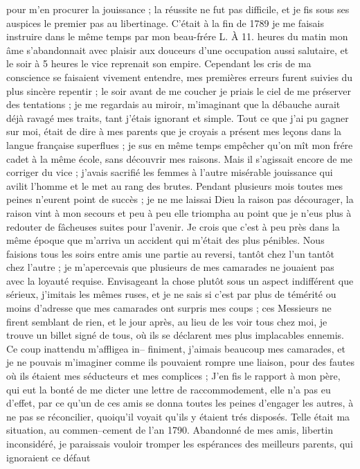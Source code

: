 \documentclass[12pt]{article}
\begin{document}
 pour m’en procurer la jouissance ; la réussite ne
fut pas difficile, et je fis sous ses auspices le premier pas au libertinage. C’était à la fin de
1789 je me faisais instruire dans le même temps par mon beau-frére L. À 11. heures du matin mon âme
s’abandonnait avec plaisir aux douceurs d’une occupation aussi salutaire, et le soir à 5 heures le
vice reprenait son empire. Cependant les cris de ma conscience se faisaient vivement entendre, mes
premières erreurs furent suivies du plus sincère repentir ; le soir avant de me coucher je priais le
ciel de me préserver des tentations ; je me regardais au miroir, m’imaginant que la débauche aurait
déjà ravagé mes traits, tant j’étais ignorant et simple. Tout ce que j’ai pu gagner sur moi, était
de dire à mes parents que je croyais a présent mes leçons dans la langue française superflues ; je
sus en même temps empêcher qu’on mît mon frére cadet à la même école, sans découvrir mes raisons.
Mais il s’agissait encore de me corriger du vice ; j’avais sacrifié les femmes à l’autre misérable
jouissance qui avilit l’homme et le met au rang des brutes. Pendant plusieurs mois toutes mes peines
n’eurent point de succès ; je ne me laissai Dieu la raison pas décourager, la raison vint à mon
secours et peu à peu elle triompha au point que je n’eus plus à redouter de fâcheuses suites pour
l’avenir. Je crois que c’est à peu près dans la même époque que m’arriva un accident qui m’était des
plus pénibles. Nous faisions tous les soirs entre amis une partie au reversi, tantôt chez l’un
tantôt chez l’autre ; je m’apercevais que plusieurs de mes camarades ne jouaient pas avec la loyauté
requise. Envisageant la chose plutôt sous un aspect indifférent que sérieux, j’imitais les mêmes
ruses, et je ne sais si c’est par plus de témérité ou moins d’adresse que mes camarades ont surpris
mes coups ; ces Messieurs ne firent semblant de rien, et le jour après, au lieu de les voir tous
chez moi, je trouve un billet signé de tous, où ils se déclarent mes plus implacables ennemis. Ce
coup inattendu m’affligea in– finiment, j’aimais beaucoup mes camarades, et je ne pouvais m’imaginer
comme ils pouvaient rompre une liaison, pour des fautes où ils étaient mes séducteurs et mes
complices ; J’en fis le rapport à mon père, qui eut la bonté de me dicter une lettre de
raccommodement, elle n’a pas eu d’effet, par ce qu’un de ces amis se donna toutes les peines
d’engager les autres, à ne pas se réconcilier, quoiqu’il voyait qu’ils y étaient trés disposés.
Telle était ma situation, au commen–cement de l’an 1790. Abandonné de mes amis, libertin
inconsidéré, je paraissais vouloir tromper les espérances des meilleurs parents, qui ignoraient ce
défaut
\end{document}
